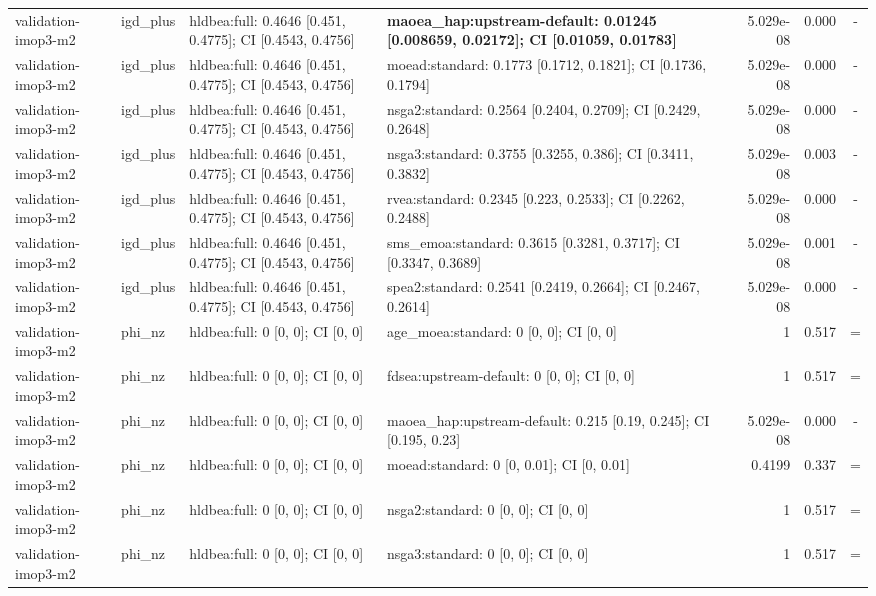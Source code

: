 \begin{tabular}{llllrrc}
validation-imop3-m2 & igd\_plus & hldbea:full: 0.4646 [0.451, 0.4775]; CI [0.4543, 0.4756] & \textbf{maoea\_hap:upstream-default: 0.01245 [0.008659, 0.02172]; CI [0.01059, 0.01783]} & 5.029e-08 & 0.000 & - \\
validation-imop3-m2 & igd\_plus & hldbea:full: 0.4646 [0.451, 0.4775]; CI [0.4543, 0.4756] & moead:standard: 0.1773 [0.1712, 0.1821]; CI [0.1736, 0.1794] & 5.029e-08 & 0.000 & - \\
validation-imop3-m2 & igd\_plus & hldbea:full: 0.4646 [0.451, 0.4775]; CI [0.4543, 0.4756] & nsga2:standard: 0.2564 [0.2404, 0.2709]; CI [0.2429, 0.2648] & 5.029e-08 & 0.000 & - \\
validation-imop3-m2 & igd\_plus & hldbea:full: 0.4646 [0.451, 0.4775]; CI [0.4543, 0.4756] & nsga3:standard: 0.3755 [0.3255, 0.386]; CI [0.3411, 0.3832] & 5.029e-08 & 0.003 & - \\
validation-imop3-m2 & igd\_plus & hldbea:full: 0.4646 [0.451, 0.4775]; CI [0.4543, 0.4756] & rvea:standard: 0.2345 [0.223, 0.2533]; CI [0.2262, 0.2488] & 5.029e-08 & 0.000 & - \\
validation-imop3-m2 & igd\_plus & hldbea:full: 0.4646 [0.451, 0.4775]; CI [0.4543, 0.4756] & sms\_emoa:standard: 0.3615 [0.3281, 0.3717]; CI [0.3347, 0.3689] & 5.029e-08 & 0.001 & - \\
validation-imop3-m2 & igd\_plus & hldbea:full: 0.4646 [0.451, 0.4775]; CI [0.4543, 0.4756] & spea2:standard: 0.2541 [0.2419, 0.2664]; CI [0.2467, 0.2614] & 5.029e-08 & 0.000 & - \\
validation-imop3-m2 & phi\_nz & hldbea:full: 0 [0, 0]; CI [0, 0] & age\_moea:standard: 0 [0, 0]; CI [0, 0] & 1 & 0.517 & = \\
validation-imop3-m2 & phi\_nz & hldbea:full: 0 [0, 0]; CI [0, 0] & fdsea:upstream-default: 0 [0, 0]; CI [0, 0] & 1 & 0.517 & = \\
validation-imop3-m2 & phi\_nz & hldbea:full: 0 [0, 0]; CI [0, 0] & maoea\_hap:upstream-default: 0.215 [0.19, 0.245]; CI [0.195, 0.23] & 5.029e-08 & 0.000 & - \\
validation-imop3-m2 & phi\_nz & hldbea:full: 0 [0, 0]; CI [0, 0] & moead:standard: 0 [0, 0.01]; CI [0, 0.01] & 0.4199 & 0.337 & = \\
validation-imop3-m2 & phi\_nz & hldbea:full: 0 [0, 0]; CI [0, 0] & nsga2:standard: 0 [0, 0]; CI [0, 0] & 1 & 0.517 & = \\
validation-imop3-m2 & phi\_nz & hldbea:full: 0 [0, 0]; CI [0, 0] & nsga3:standard: 0 [0, 0]; CI [0, 0] & 1 & 0.517 & = \\

\end{tabular}
